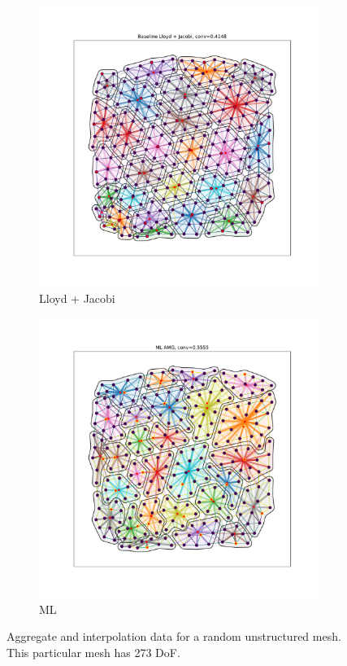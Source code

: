 \documentclass{article}
\begin{document}
\begin{figure}[h]
\begin{subfigure}[t]{0.32\textwidth}
    \includegraphics[width=\textwidth, trim=80 70 70 50, clip]{grid_800_lloyd.pdf}
    \caption{Lloyd + Jacobi}
  \end{subfigure}
  \begin{subfigure}[t]{0.32\textwidth}
    \centering
    \includegraphics[width=\textwidth, trim=80 70 70 50, clip]{grid_800_ml.pdf}
    \caption{ML}
  \end{subfigure}
  \caption{Aggregate and interpolation data for a random unstructured mesh.  This particular mesh has 273 DoF.}
  \label{fig:grid800}
\end{figure}
\end{document}

